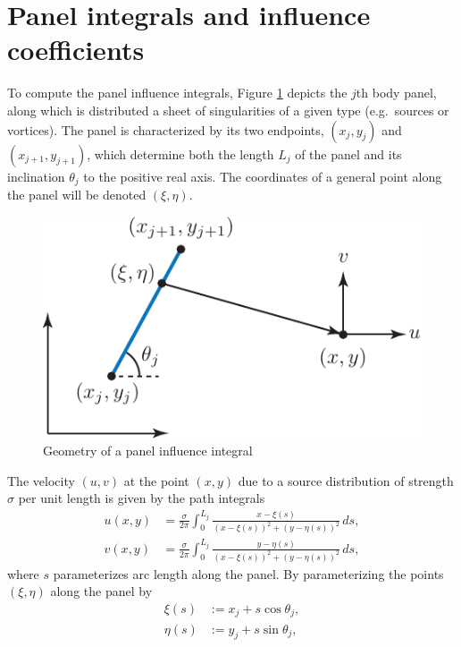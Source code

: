 \documentclass[10pt]{article}
\newcommand\figref[1]{Figure \ref{#1}}
\def\eg{e.g.~}
\begin{document}
\appendix
\section{Panel integrals and influence coefficients}
To compute the panel influence integrals, \figref{fig:panel_integral} depicts the $j$th body panel, along which is distributed a sheet of singularities of a given type (\eg sources or vortices).  The panel is characterized by its two endpoints, $(x_j,y_j)$ and $(x_{j+1},y_{j+1})$, which determine both the length $L_j$ of the panel and its inclination $\theta_j$ to the positive real axis.  The coordinates of a general point along the panel will be denoted $(\xi,\eta)$.
\begin{figure}[H]
\begin{center}
\includegraphics[scale=.8]{figures/panel_integral.pdf}
\caption{Geometry of a panel influence integral}\label{fig:panel_integral}
\end{center}
\end{figure}
The velocity $(u,v)$ at the point $(x,y)$ due to a source distribution of strength $\sigma$ per unit length is given by the path integrals
\begin{align*}
u(x,y)&=\frac{\sigma}{2\pi}\int_0^{L_j}\frac{x-\xi(s)}{(x-\xi(s))^2+(y-\eta(s))^2}\,ds,\\
v(x,y)&=\frac{\sigma}{2\pi}\int_0^{L_j}\frac{y-\eta(s)}{(x-\xi(s))^2+(y-\eta(s))^2}\,ds,
\end{align*}
where $s$ parameterizes arc length along the panel.  By parameterizing the points $(\xi,\eta)$ along the panel by
\begin{equation*}
\begin{aligned}
\xi(s) &:= x_j+s\cos\theta_j,\\
\eta(s) &:= y_j+s\sin\theta_j,
\end{aligned}
\end{equation*}
\end{document}
